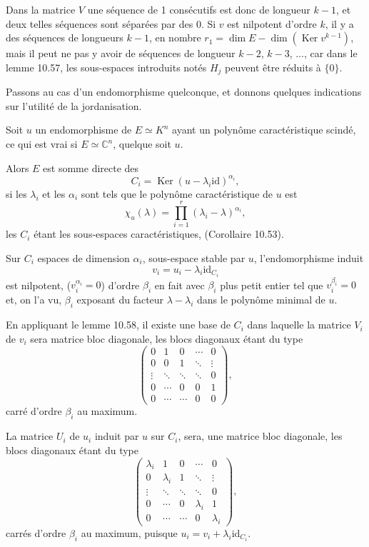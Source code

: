 Dans la matrice $V$ une séquence de 1 consécutifs est donc de longueur $k-1$, et deux telles séquences sont séparées par des 0.
Si $v$ est nilpotent d'ordre $k$, il y a des séquences de longueurs $k-1$, en nombre $r_1=\dim E-\dim(\operatorname{Ker}v^{k-1})$, mais il peut ne pas y avoir de séquences de longueur $k-2$, $k-3$, ..., car dans le lemme 10.57, les sous-espaces introduits notés $H_j$ peuvent être réduits à $\{0\}$. \bookend

Passons au cas d'un endomorphisme quelconque, et donnons quelques indications sur l'utilité de la jordanisation.

Soit $u$ un endomorphisme de $E\simeq K^n$ ayant un polynôme caractéristique scindé, ce qui est vrai si $E\simeq\mathbb C^n$, quelque soit $u$.

Alors $E$ est somme directe des
\[
C_i=\operatorname{Ker}(u-\lambda_i\mathrm{id})^{\alpha_i},
\]
si les $\lambda_i$ et les $\alpha_i$ sont tels que le polynôme caractéristique de $u$ est
\[
\chi_u(\lambda)=\prod_{i=1}^r(\lambda_i-\lambda)^{\alpha_i},
\]
les $C_i$ étant les sous-espaces caractéristiques, (Corollaire 10.53).

Sur $C_i$ espaces de dimension $\alpha_i$, sous-espace stable par $u$, l'endomorphisme induit
\[
v_i=u_i-\lambda_i\mathrm{id}_{C_i}
\]
est nilpotent, ($v_i^{\alpha_i}=0$) d'ordre $\beta_i$ en fait avec $\beta_i$ plus petit entier tel que $v_i^{\beta_i}=0$ et, on l'a vu, $\beta_i$ exposant du facteur $\lambda-\lambda_i$ dans le polynôme minimal de $u$.

En appliquant le lemme 10.58, il existe une base de $C_i$ dans laquelle la matrice $V_i$ de $v_i$ sera matrice bloc diagonale, les blocs diagonaux étant du type
\[
\begin{pmatrix}
0&1&0&\cdots&0\\
0&0&1&\ddots&\vdots\\
\vdots&\ddots&\ddots&\ddots&0\\
0&\cdots&0&0&1\\
0&\cdots&\cdots&0&0
\end{pmatrix},
\]
carré d'ordre $\beta_i$ au maximum.

La matrice $U_i$ de $u_i$ induit par $u$ sur $C_i$, sera, une matrice bloc diagonale, les blocs diagonaux étant du type
\[
\begin{pmatrix}
\lambda_i&1&0&\cdots&0\\
0&\lambda_i&1&\ddots&\vdots\\
\vdots&\ddots&\ddots&\ddots&0\\
0&\cdots&0&\lambda_i&1\\
0&\cdots&\cdots&0&\lambda_i
\end{pmatrix},
\]
carrés d'ordre $\beta_i$ au maximum, puisque $u_i=v_i+\lambda_i\mathrm{id}_{C_i}$.

